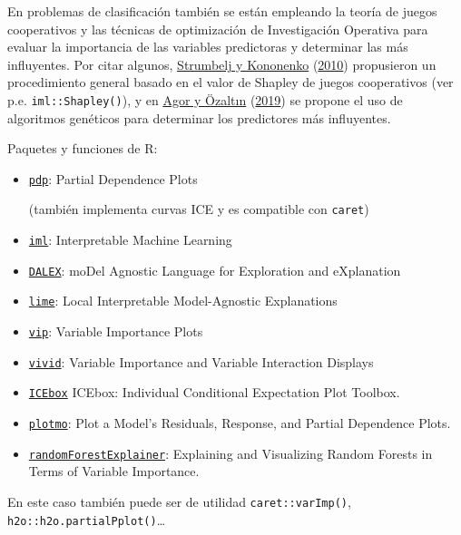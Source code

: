 \documentclass[
  spanish,
]{book}
\theoremstyle{break}
\theoremstyle{definition}
\theoremstyle{definition}
\theoremstyle{definition}
\theoremstyle{definition}
\theoremstyle{remark}
\begin{document}
En problemas de clasificación también se están empleando la teoría de juegos cooperativos y las técnicas de optimización de Investigación Operativa para evaluar la importancia de las variables predictoras y determinar las más influyentes.
Por citar algunos, \protect\hyperlink{ref-strumbelj2010efficient}{Strumbelj y Kononenko} (\protect\hyperlink{ref-strumbelj2010efficient}{2010}) propusieron un procedimiento general basado en el valor de Shapley de juegos cooperativos (ver p.e. \texttt{iml::Shapley()}), y en \protect\hyperlink{ref-agor2019feature}{Agor y Özaltın} (\protect\hyperlink{ref-agor2019feature}{2019}) se propone el uso de algoritmos genéticos para determinar los predictores más influyentes.

Paquetes y funciones de R:

\begin{itemize}
\item
  \href{https://bgreenwell.github.io/pdp/index.html}{\texttt{pdp}}: Partial Dependence Plots

  (también implementa curvas ICE y es compatible con \texttt{caret})
\item
  \href{https://christophm.github.io/iml}{\texttt{iml}}: Interpretable Machine Learning
\item
  \href{https://modeloriented.github.io/DALEX}{\texttt{DALEX}}: moDel Agnostic Language for Exploration and eXplanation
\item
  \href{https://lime.data-imaginist.com}{\texttt{lime}}: Local Interpretable Model-Agnostic Explanations
\item
  \href{https://koalaverse.github.io/vip/index.html}{\texttt{vip}}: Variable Importance Plots
\item
  \href{https://github.com/AlanInglis/vivid}{\texttt{vivid}}: Variable Importance and Variable Interaction Displays
\item
  \href{https://CRAN.R-project.org/package=ICEbox}{\texttt{ICEbox}} ICEbox: Individual Conditional Expectation Plot Toolbox.
\item
  \href{http://www.milbo.users.sonic.net/}{\texttt{plotmo}}: Plot a Model's Residuals, Response, and Partial Dependence Plots.
\item
  \href{https://modeloriented.github.io/randomForestExplainer}{\texttt{randomForestExplainer}}: Explaining and Visualizing Random Forests in Terms of Variable Importance.
\end{itemize}

En este caso también puede ser de utilidad \texttt{caret::varImp()}, \texttt{h2o::h2o.partialPplot()}\ldots{}
\end{document}
